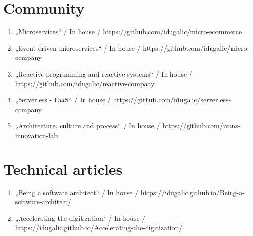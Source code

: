 \section*{Community}
\begin{enumerate}[label=,leftmargin=0cm,itemsep=10pt]
\item „Microservices“ / In house / https://github.com/idugalic/micro-ecommerce
\item „Event driven microservices“ / In house / https://github.com/idugalic/micro-company
\item „Reactive programming and reactive systems“ / In house / https://github.com/idugalic/reactive-company
\item „Serverless - FaaS“ / In house / https://github.com/idugalic/serverless-company
\item „Architecture, culture and process“ / In house / https://github.com/ivans-innovation-lab
\end{enumerate}

\section*{Technical articles}
\begin{enumerate}[label=,leftmargin=0cm,itemsep=10pt]
\item „Being a software architect“ / In house / https://idugalic.github.io/Being-a-software-architect/
\item „Accelerating the digitization“ / In house / https://idugalic.github.io/Accelerating-the-digitization/
\end{enumerate}
